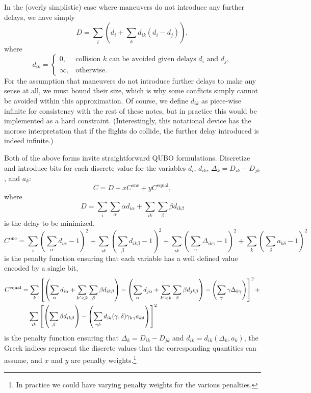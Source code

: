 \documentclass{article}
\begin{document}
In the (overly simplistic) case where maneuvers do not introduce any further delays, we have simply
\begin{equation*}
D = 
\sum_i
\left(d_i + \sum_k d_{ik}(d_i - d_j) \right),
\end{equation*}
where
\begin{equation*}
    d_{ik} = \begin{cases} 0, & \text{collision $k$ can be avoided given delays $d_i$ and $d_j$},\\
    \infty, & \text{otherwise}.
\end{cases}
\end{equation*}
For the assumption that maneuvers do not introduce further delays to make any sense at all, we must bound their size, which is why some conflicts simply cannot be avoided within this approximation.
Of course, we define $d_{ik}$ as piece-wise infinite for consistency with the rest of these notes, but in practice this would be implemented as a hard constraint.
(Interestingly, this notational device has the morose interpretation that if the flights do collide, the further delay introduced is indeed infinite.)

Both of the above forms invite straightforward QUBO formulations.
Discretize and introduce bits for each discrete value for the variables $d_i$, $d_{ik}$, $\Delta_k = D_{ik} - D_{jk}$, and $a_k$:
\begin{equation*}
    C = D + x C^{\mathrm{one}} + y C^{\mathrm{equal}},
\end{equation*}
where 
\begin{equation*}
D = 
\sum_{i} \sum_{\alpha} \alpha d_{i\alpha}
+
\sum_{ik} \sum_{\beta} \beta d_{ik\beta}
\end{equation*}
is the delay to be minimized,
\begin{equation*}
C^{\mathrm{one}}
=
\sum_i \left(\sum_{\alpha} d_{i\alpha}- 1 \right)^2 
+
\sum_{ik} \left(\sum_{\beta} d_{ik\beta} - 1\right)^2
+
\sum_{ik} \left(\sum_{\gamma} \Delta_{ik\gamma} - 1\right)^2
+
\sum_{k} \left(\sum_{\delta} a_{k\delta}- 1\right)^2
\end{equation*}
is the penalty function ensuring that each variable has a well defined value encoded by a single bit,
\begin{align*}
C^{\mathrm{equal}}
&=
\sum_{k} \left[
\left(\sum_{\alpha} d_{i\alpha} + \sum_{k' < k} \sum_{\beta} \beta d_{ik\beta}\right)
-
\left(\sum_{\alpha} d_{j\alpha} + \sum_{k' < k} \sum_{\beta} \beta d_{jk\beta}\right)
-
\left(\sum_{\gamma} \gamma \Delta_{k\gamma}\right)\right]^2
+ \\
&\hphantom{=,}
\sum_{ik} \left[
    \left(\sum_{\beta} \beta d_{ik\beta}\right) - 
\left(\sum_{\gamma \delta} d_{ik} (\gamma, \delta) \gamma_{k\gamma} a_{k\delta}\right)\right]^2
\end{align*}
is the penalty function ensuring that $\Delta_k = D_{ik} - D_{jk}$ and $d_{ik} = d_{ik}(\Delta_k, a_k)$, 
the Greek indices represent the discrete values that the corresponding quantities can assume, and $x$ and $y$ are penalty weights.\footnote{In practice we could have varying penalty weights for the various penalties.}
\end{document}
